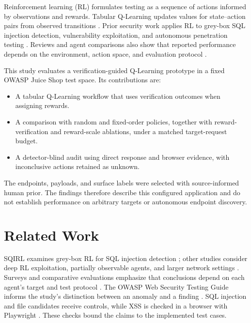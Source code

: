 \documentclass[conference, a4paper]{IEEEtran}
\begin{document}
Reinforcement learning (RL) formulates testing as a sequence of
actions informed by observations and rewards. Tabular Q-Learning
updates values for state--action pairs from observed transitions
\cite{sutton2018}. Prior security work applies RL to grey-box SQL
injection detection, vulnerability exploitation, and autonomous
penetration testing \cite{sqirl2023,almajali2024,li2025}. Reviews
and agent comparisons also show that reported performance depends
on the environment, action space, and evaluation protocol
\cite{rlreview2026,sok2024}.

This study evaluates a verification-guided Q-Learning prototype in
a fixed OWASP Juice Shop test space. Its contributions are:

\begin{itemize}
    \item A tabular Q-Learning workflow that uses verification
    outcomes when assigning rewards.

    \item A comparison with random and fixed-order policies,
    together with reward-verification and reward-scale ablations,
    under a matched target-request budget.

    \item A detector-blind audit using direct response and browser
    evidence, with inconclusive actions retained as unknown.
\end{itemize}

The endpoints, payloads, and surface labels were selected with
source-informed human prior. The findings therefore describe this
configured application and do not establish performance on arbitrary
targets or autonomous endpoint discovery.

\section{Related Work}

SQIRL examines grey-box RL for SQL injection detection \cite{sqirl2023};
other studies consider deep RL exploitation, partially observable
agents, and larger network settings \cite{almajali2024,li2025,ghanem2023}.
Surveys and comparative evaluations emphasize that conclusions depend
on each agent's target and test protocol \cite{rlreview2026,sok2024}.
The OWASP Web Security Testing Guide informs the study's distinction
between an anomaly and a finding \cite{owaspwstg}. SQL injection and
file candidates receive controls, while XSS is checked in a browser
with Playwright \cite{playwright}. These checks bound the claims to
the implemented test cases.
\end{document}
